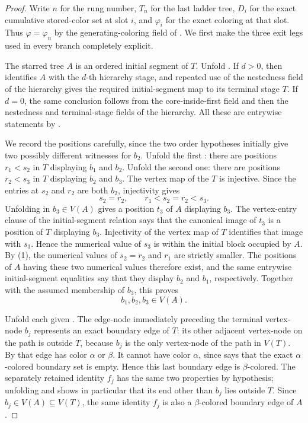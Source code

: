 \begin{proof}
Write $n$ for the rung number, $T_n$ for the last ladder tree, $D_i$ for
the exact cumulative stored-color set at slot $i$, and $\varphi_i$ for
the exact coloring at that slot.  Thus $\varphi=\varphi_n$ by the
generating-coloring field of .  We first
make the three exit legs used in every branch completely explicit.

The starred tree $A$ is an ordered initial segment of $T$.  Unfold
.  If $d>0$, then
 identifies $A$ with the $d$-th hierarchy
stage, and repeated use of the nestedness field of the hierarchy gives
the required initial-segment map to its terminal stage $T$.  If $d=0$,
the same conclusion follows from the core-inside-first field and then the
nestedness and terminal-stage fields of the hierarchy.  All these are
entrywise statements by .

We record the positions carefully, since the two order hypotheses initially
give two possibly different witnesses for $b_2$.  Unfold the first
: there are positions $r_1<s_2$ in $T$ displaying
$b_1$ and $b_2$.  Unfold the second one: there are positions $r_2<s_3$ in
$T$ displaying $b_2$ and $b_3$.  The vertex map of the
 $T$ is injective.  Since the entries at $s_2$ and
$r_2$ are both $b_2$, injectivity gives
\[
                         s_2=r_2,\qquad r_1<s_2=r_2<s_3.       \tag{1}
\]
Unfolding  in $b_3\in V(A)$ gives a
position $t_3$ of $A$ displaying $b_3$.  The vertex-entry clause of the
initial-segment relation says that the canonical image of $t_3$ is a
position of $T$ displaying $b_3$.  Injectivity of the vertex map of $T$
identifies that image with $s_3$.  Hence the numerical value of $s_3$ is
within the initial block occupied by $A$.  By (1), the numerical values of
$s_2=r_2$ and $r_1$ are strictly smaller.  The positions of $A$ having
these two numerical values therefore exist, and the same entrywise
initial-segment equalities say that they display $b_2$ and $b_1$,
respectively.  Together with the assumed membership of $b_3$, this proves
\[
                         b_1,b_2,b_3\in V(A).                  \tag{2}
\]

Unfold each given .  The edge-node immediately
preceding the terminal vertex-node $b_j$ represents an exact boundary
edge of $T$: its other adjacent vertex-node on the path is outside $T$,
because $b_j$ is the only vertex-node of the path in $V(T)$.  By
 that edge has color $\alpha$ or
$\beta$.  It cannot have color $\alpha$, since
 says that the exact $\alpha$-colored
boundary set is empty.  Hence this last boundary edge is
$\beta$-colored.  The separately retained identity $f_j$ has the same
two properties by hypothesis; unfolding 
and  shows in particular that its end other than
$b_j$ lies outside $T$.  Since $b_j\in V(A)\subseteq V(T)$, the same
identity $f_j$ is also a $\beta$-colored boundary edge of $A$.


\end{proof}
